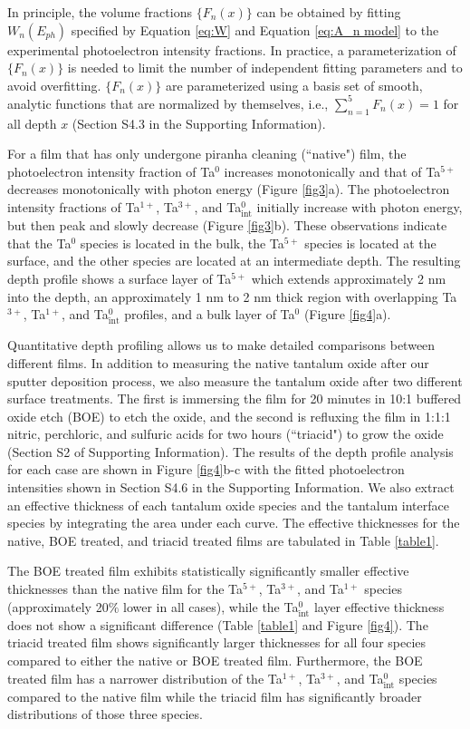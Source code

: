 \documentclass{WileyMSP-template}
\begin{document}
In principle, the volume fractions $\{F_n(x)\}$ can be obtained by fitting $W_n(E_{ph})$ specified by Equation \ref{eq:W} and Equation \ref{eq:A_n model} to the experimental photoelectron intensity fractions. In practice, a parameterization of $\{F_n(x)\}$ is needed to limit the number of independent fitting parameters and to avoid overfitting. $\{F_n(x)\}$ are parameterized using a basis set of smooth, analytic functions that are normalized by themselves, i.e., $\sum_{n=1}^5 F_n(x) = 1$ for all depth $x$ (Section S4.3 in the Supporting Information).

For a film that has only undergone piranha cleaning (``native") film, the photoelectron intensity fraction of Ta$^0$ increases monotonically and that of Ta$^{5+}$ decreases monotonically with photon energy (Figure \ref{fig3}a). The photoelectron intensity fractions of Ta$^{1+}$, Ta$^{3+}$, and Ta$^0_{\text{int}}$ initially increase with photon energy, but then peak and slowly decrease (Figure \ref{fig3}b). These observations indicate that the Ta$^0$ species is located in the bulk, the Ta$^{5+}$ species is located at the surface, and the other species are located at an intermediate depth. The resulting depth profile shows a surface layer of Ta$^{5+}$ which extends approximately 2 nm into the depth, an approximately 1 nm to 2 nm thick region with overlapping Ta$^{3+}$, Ta$^{1+}$, and Ta$^{0}_{\text{int}}$ profiles, and a bulk layer of Ta$^0$ (Figure \ref{fig4}a).

Quantitative depth profiling allows us to make detailed comparisons between different films. In addition to measuring the native tantalum oxide after our sputter deposition process, we also measure the tantalum oxide after two different surface treatments. The first is immersing the film for 20 minutes in 10:1 buffered oxide etch (BOE) to etch the oxide, and the second is refluxing the film in 1:1:1 nitric, perchloric, and sulfuric acids for two hours (``triacid") to grow the oxide (Section S2 of Supporting Information). The results of the depth profile analysis for each case are shown in Figure \ref{fig4}b-c with the fitted photoelectron intensities shown in Section S4.6 in the Supporting Information. We also extract an effective thickness of each tantalum oxide species and the tantalum interface species by integrating the area under each curve. The effective thicknesses for the native, BOE treated, and triacid treated films are tabulated in Table \ref{table1}.

The BOE treated film exhibits statistically significantly smaller effective thicknesses than the native film for the Ta$^{5+}$, Ta$^{3+}$, and Ta$^{1+}$ species (approximately 20$\%$ lower in all cases), while the Ta$^0_{\text{int}}$ layer effective thickness does not show a significant difference (Table \ref{table1} and Figure \ref{fig4}). The triacid treated film shows significantly larger thicknesses for all four species compared to either the native or BOE treated film. Furthermore, the BOE treated film has a narrower distribution of the Ta$^{1+}$, Ta$^{3+}$, and Ta$^0_{\text{int}}$ species compared to the native film while the triacid film has significantly broader distributions of those three species.
\end{document}
